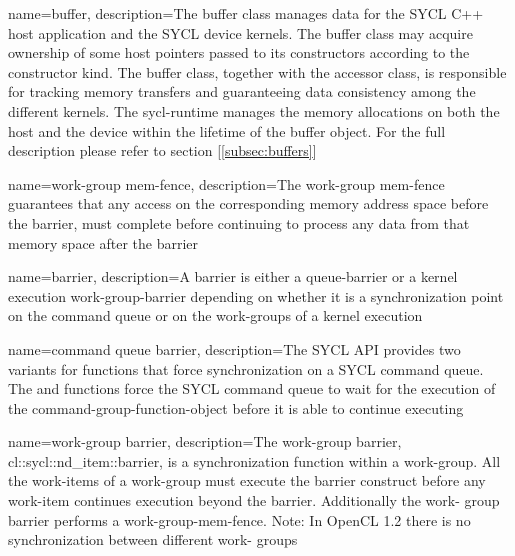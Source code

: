 {
  name=buffer,
  description={The buffer class manages data for the SYCL C++ host
               application and the SYCL device kernels. The buffer class
               may acquire ownership of some host pointers passed to its
               constructors according to the constructor kind.
               \glspar
               The buffer class, together with the accessor class,
               is responsible for tracking memory transfers and guaranteeing
               data consistency among the different kernels.
               The \gls{sycl-runtime} manages the memory allocations
               on both the host and the \gls{device} within the
               lifetime of the buffer object. For the full
               description please refer to section [\ref{subsec:buffers}]}
}

{
  name={work-group mem-fence},
  description={The work-group mem-fence guarantees that any access on the
               corresponding memory address space before the barrier, must
               complete before continuing to process any data from that memory
               space after the barrier}
}

{
  name=barrier,
  description={A barrier is either a \gls{queue-barrier} or a
               kernel execution \gls{work-group-barrier} depending on whether it is
               a synchronization point on the command queue or on
               the work-groups of a kernel execution}
}

{
  name={command queue barrier},
  description={The SYCL API provides two variants for functions that force
               synchronization on a SYCL command queue. The
                and
               functions force the SYCL command queue to wait for the
               execution of the \gls{command-group-function-object} before it is able to
               continue executing}
}

{
  name={work-group barrier},
  description={The work-group barrier, cl::sycl::nd_item::barrier, is a 
               synchronization function within a \gls{work-group}. All the
               \glspl{work-item} of a work-group must execute the barrier construct before any \gls{work-item}
               continues execution beyond the barrier. Additionally the work-
               group barrier performs a \gls{work-group-mem-fence}. Note: In
               OpenCL 1.2 there is no synchronization between different work-
               groups}
}

